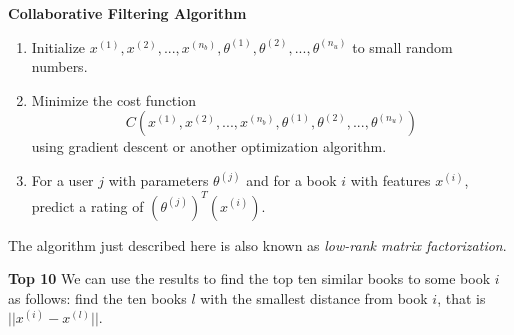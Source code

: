 \documentclass[xcolor=dvipsnames]{beamer}
\begin{document}
\begin{frame}
{\bf Collaborative Filtering Algorithm}
\begin{enumerate}
\item Initialize $x^{(1)}, x^{(2)}, ..., x^{(n_b)}, \theta^{(1)}, \theta^{(2)}, ..., \theta^{(n_u)}$ to small random numbers.\vfill\pause
\item Minimize the cost function 
\[C(x^{(1)}, x^{(2)}, ..., x^{(n_b)}, \theta^{(1)}, \theta^{(2)}, ..., \theta^{(n_u)})\]
using gradient descent or another optimization algorithm.\vfill\pause
\item For a user $j$ with parameters $\theta^{(j)}$ and for a book $i$ with features $x^{(i)}$, predict a rating of $(\theta^{(j)})^T(x^{(i)})$.
\end{enumerate} 
\vfill\pause
The algorithm just described here is also known as \emph{low-rank matrix factorization}.
\end{frame}

\begin{frame}
{\bf Top 10}
We can use the results to find the top ten similar books to some book $i$ as follows: \vfill\pause find the ten books $l$ with the smallest distance from book $i$, that is $||x^{(i)} - x^{(l)}||$.
\end{frame}
\end{document}
